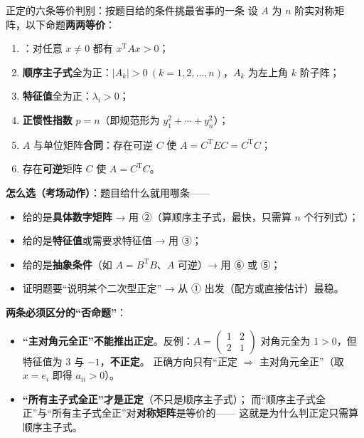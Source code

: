 \begin{fdeep}{正定的六条等价判别：按题目给的条件挑最省事的一条}
设 $A$ 为 $n$ 阶实对称矩阵，以下命题\textbf{两两等价}：
\begin{enumerate}[leftmargin=2.2em,itemsep=0.22em]
\item {}：对任意 $x\ne0$ 都有 $x^{\mathrm T}Ax>0$；
\item \textbf{顺序主子式}全为正：$\lvert A_k\rvert>0\ (k=1,2,\dots,n)$，$A_k$ 为左上角 $k$ 阶子阵；
\item \textbf{特征值}全为正：$\lambda_i>0$；
\item \textbf{正惯性指数} $p=n$（即规范形为 $y_1^{2}+\cdots+y_n^{2}$）；
\item $A$ 与单位矩阵\textbf{合同}：存在可逆 $C$ 使 $A=C^{\mathrm T}EC=C^{\mathrm T}C$；
\item 存在\textbf{可逆}矩阵 $C$ 使 $A=C^{\mathrm T}C$。
\end{enumerate}

\textbf{怎么选（考场动作）}：题目给什么就用哪条——
\begin{itemize}[leftmargin=2.2em,itemsep=0.22em]
\item 给的是\textbf{具体数字矩阵} → 用 ②（算顺序主子式，最快，只需算 $n$ 个行列式）；
\item 给的是\textbf{特征值}或需要求特征值 → 用 ③；
\item 给的是\textbf{抽象条件}（如 $A=B^{\mathrm T}B$、$A$ 可逆）→ 用 ⑥ 或 ⑤；
\item 证明题要“说明某个二次型正定” → 从 ① 出发（配方或直接估计）最稳。
\end{itemize}

\textbf{两条必须区分的“否命题”}：
\begin{itemize}[leftmargin=2.2em,itemsep=0.22em]
\item \textbf{“主对角元全正”不能推出正定}。反例：$A=\begin{pmatrix}1&2\\2&1\end{pmatrix}$
      对角元全为 $1>0$，但特征值为 $3$ 与 $-1$，\textbf{不正定}。
      正确方向只有“正定 $\Rightarrow$ 主对角元全正”（取 $x=e_i$ 即得 $a_{ii}>0$）。
\item \textbf{“所有主子式全正”才是正定}（不只是顺序主子式）；
      而“顺序主子式全正”与“所有主子式全正”对\textbf{对称矩阵}是等价的——
      这就是为什么判正定只需算顺序主子式。
\end{itemize}


\end{fdeep}
